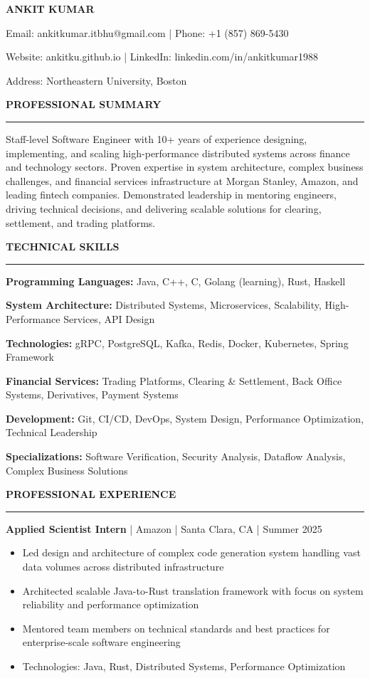 \documentclass[11pt,letterpaper]{article}
\newcommand{\cvsection}[1]{
    \vspace{0.5em}
    \textbf{\large #1}
    \vspace{0.2em}
    \hrule
    \vspace{0.3em}
}
\newcommand{\cventry}[6]{
    \textbf{#1} | #2 | #3 | #4
    \vspace{0.1em}
    #6
    \vspace{0.3em}
}
\begin{document}
\begin{center}
    \textbf{\LARGE ANKIT KUMAR}
    \vspace{0.3em}

    Email: ankitkumar.itbhu@gmail.com | Phone: +1 (857) 869-5430

    Website: ankitku.github.io | LinkedIn: linkedin.com/in/ankitkumar1988

    Address: Northeastern University, Boston
\end{center}

\cvsection{PROFESSIONAL SUMMARY}
Staff-level Software Engineer with 10+ years of experience designing, implementing, and scaling high-performance distributed systems across finance and technology sectors. Proven expertise in system architecture, complex business challenges, and financial services infrastructure at Morgan Stanley, Amazon, and leading fintech companies. Demonstrated leadership in mentoring engineers, driving technical decisions, and delivering scalable solutions for clearing, settlement, and trading platforms.

\cvsection{TECHNICAL SKILLS}
\textbf{Programming Languages:} Java, C++, C, Golang (learning), Rust, Haskell

\textbf{System Architecture:} Distributed Systems, Microservices, Scalability, High-Performance Services, API Design

\textbf{Technologies:} gRPC, PostgreSQL, Kafka, Redis, Docker, Kubernetes, Spring Framework

\textbf{Financial Services:} Trading Platforms, Clearing & Settlement, Back Office Systems, Derivatives, Payment Systems

\textbf{Development:} Git, CI/CD, DevOps, System Design, Performance Optimization, Technical Leadership

\textbf{Specializations:} Software Verification, Security Analysis, Dataflow Analysis, Complex Business Solutions

\cvsection{PROFESSIONAL EXPERIENCE}

\cventry{Applied Scientist Intern}{Amazon}{Santa Clara, CA}{Summer 2025}{}{
\begin{itemize}
    \item Led design and architecture of complex code generation system handling vast data volumes across distributed infrastructure
    \item Architected scalable Java-to-Rust translation framework with focus on system reliability and performance optimization
    \item Mentored team members on technical standards and best practices for enterprise-scale software engineering
    \item Technologies: Java, Rust, Distributed Systems, Performance Optimization
\end{itemize}
}
\end{document}
